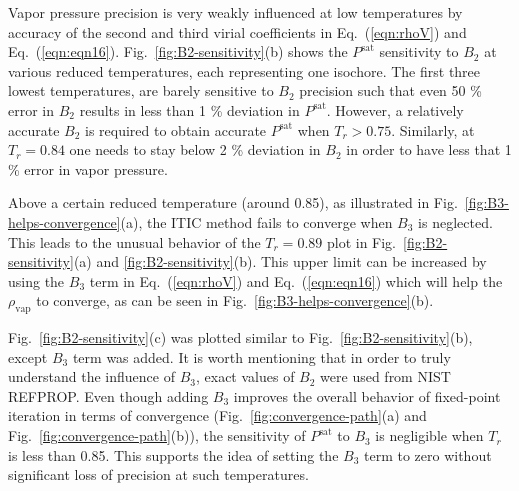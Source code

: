 \documentclass[5p,times]{elsarticle}
\begin{document}
Vapor pressure precision is very weakly influenced at low temperatures by accuracy of the second and third virial coefficients in Eq.~(\ref{eqn:rhoV}) and Eq.~(\ref{eqn:eqn16}). Fig.~\ref{fig:B2-sensitivity}(b) shows the $P^{\mathrm{sat}}$ sensitivity to $B_2$ at various reduced temperatures, each representing one isochore. The first three lowest temperatures, are barely sensitive to $B_2$ precision such that even 50 \% error in $B_2$ results in less than 1 \% deviation in $P^{\mathrm{sat}}$. However, a relatively accurate $B_2$ is required to obtain accurate $P^{\mathrm{sat}}$ when $T_r>0.75$. Similarly, at $T_r=0.84$ one needs to stay below 2 \% deviation in $B_2$ in order to have less that 1 \% error in vapor pressure.

Above a certain reduced temperature (around 0.85), as illustrated in Fig.~\ref{fig:B3-helps-convergence}(a), the ITIC method fails to converge when $B_3$ is neglected. This leads to the unusual behavior of the $T_r=0.89$ plot in Fig.~\ref{fig:B2-sensitivity}(a) and \ref{fig:B2-sensitivity}(b). This upper limit can be increased by using the $B_3$ term in Eq.~(\ref{eqn:rhoV}) and Eq.~(\ref{eqn:eqn16}) which will help the $\rho_{\mathrm{vap}}$ to converge, as can be seen in Fig.~\ref{fig:B3-helps-convergence}(b).

Fig.~\ref{fig:B2-sensitivity}(c) was plotted similar to Fig.~\ref{fig:B2-sensitivity}(b), except $B_3$ term was added. It is worth mentioning that in order to truly understand the influence of $B_3$, exact values of $B_2$ were used from NIST REFPROP. Even though adding $B_3$ improves the overall behavior of fixed-point iteration in terms of convergence (Fig.~\ref{fig:convergence-path}(a) and Fig.~\ref{fig:convergence-path}(b)), the sensitivity of $P^{\mathrm{sat}}$ to $B_3$ is negligible when $T_r$ is less than 0.85. This supports the idea of setting the $B_3$ term to zero without significant loss of precision at such temperatures. 
\end{document}

